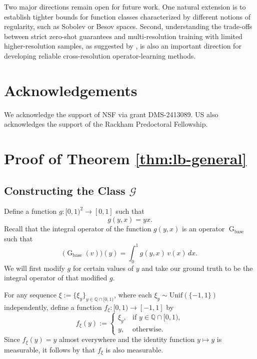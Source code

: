 \documentclass[11pt]{article}
\theoremstyle{plain}
\newcommand{\Gcal}{\mathcal{G}}
\begin{document}
Two major directions remain open for future work. One natural extension is to establish tighter bounds for function classes characterized by different notions of regularity, such as Sobolev or Besov spaces. Second, understanding the trade-offs between strict zero-shot guarantees and multi-resolution training with limited higher-resolution samples, as suggested by \cite{sakarvadia2025false}, is also an important direction for developing reliable cross-resolution operator-learning methods.


\section*{Acknowledgements}
We acknowledge the support of NSF via grant DMS-2413089.
US also acknowledges the support of the Rackham Predoctoral Fellowship.









\newpage


\newpage 

\appendix

\section{Proof of Theorem \ref{thm:lb-general}}\label{appdx:proof_lb}

\subsection{Constructing the Class $\Gcal$}
Define a function $g: [0,1)^2 \to [0,1]$ such that
\[g(y,x)=yx.\]
Recall that the integral operator of the function $g(y,x)$ is an operator $\operatorname{G}_{\text{base}}$ such that
\[\big(\operatorname{G}_{\text{base}}(v)\big)(y)=\int_{0}^1 g(y,x)\, v(x)\, dx.\]
We will first modify $g$ for certain values of $y$ and take our ground truth to be the integral operator of that modified $g$.


For any sequence $ \xi := \{\xi_y\}_{y \in \mathbb{Q} \cap [0,1)} $, where each $ \xi_y \sim \mathrm{Unif}(\{-1,1\}) $ independently, define a function $ f_{\xi} : [0,1) \to [-1,1] $ by
\[
f_{\xi}(y) := 
\begin{cases}
\xi_y, & \text{if } y \in \mathbb{Q} \cap [0,1), \\[6pt]
y, & \text{otherwise}.
\end{cases}
\]
Since $ f_{\xi}(y) = y $ almost everywhere and the identity function $ y \mapsto y $ is measurable, it follows by \citet[Proposition 2.11]{folland1999real} that $ f_{\xi} $ is also measurable. 
\end{document}
